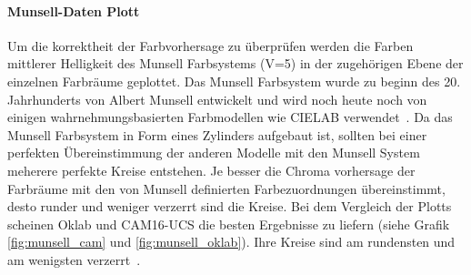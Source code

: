 \documentclass[12pt, a4paper, ngerman]{article}
\begin{document}
\paragraph{Munsell-Daten Plott}
Um die korrektheit der Farbvorhersage zu überprüfen werden die Farben mittlerer Helligkeit des Munsell Farbsystems (V=5) 
in der zugehörigen Ebene der einzelnen Farbräume geplottet. 
Das Munsell Farbsystem wurde zu beginn des 20. Jahrhunderts von Albert Munsell entwickelt und 
wird noch heute noch von einigen wahrnehmungsbasierten Farbmodellen wie CIELAB verwendet~\cite{Munsell_color_system_2022}.
Da das Munsell Farbsystem in Form eines Zylinders aufgebaut ist, 
sollten bei einer perfekten Übereinstimmung der anderen Modelle mit den Munsell System meherere perfekte Kreise entstehen.
Je besser die Chroma vorhersage der Farbräume mit den von Munsell definierten Farbezuordnungen übereinstimmt, 
desto runder und weniger verzerrt sind die Kreise. Bei dem Vergleich der Plotts scheinen Oklab und CAM16-UCS die besten Ergebnisse zu liefern (siehe Grafik \ref{fig:munsell_cam} und \ref{fig:munsell_oklab}). 
Ihre Kreise sind am rundensten und am wenigsten verzerrt~\cite{Oklab_2020}.
\end{document}
